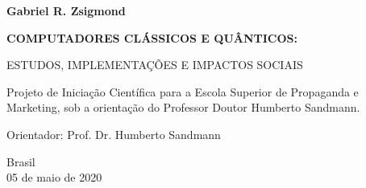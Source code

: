 \begin{titlepage}

    \begin{center}
        
        \textbf{Gabriel R. Zsigmond}
        
        \vspace{3cm}
        
        \LARGE
        \textbf{COMPUTADORES CLÁSSICOS E QUÂNTICOS:}
        
        \vspace{0.5cm}
        \large
        ESTUDOS, IMPLEMENTAÇÕES E IMPACTOS SOCIAIS
        
        \vspace{3.5cm}
        
        \begin{flushright}
        \begin{minipage}{10cm}
        Projeto de Iniciação Científica para a Escola Superior de Propaganda e Marketing, sob a orientação do Professor Doutor Humberto Sandmann.\linebreak[3]
        
        Orientador: Prof. Dr. Humberto Sandmann
        \end{minipage}
        \end{flushright}
        \vfill
        
        Brasil\\
        05 de maio de 2020\\
        
    \end{center}

\end{titlepage}